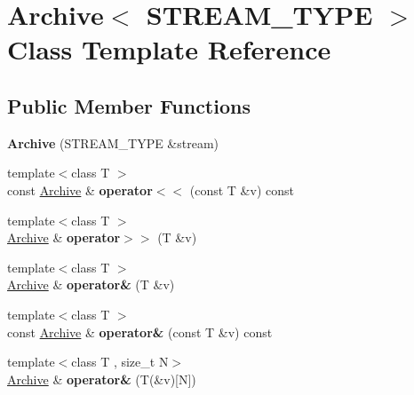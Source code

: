 \hypertarget{classArchive}{\section{Archive$<$ S\-T\-R\-E\-A\-M\-\_\-\-T\-Y\-P\-E $>$ Class Template Reference}
\label{classArchive}
}
\subsection*{Public Member Functions}
\begin{DoxyCompactItemize}
\item 
\hypertarget{classArchive_aa665ba05fffdc5e1abe19ded6dae02fa}{{\bfseries Archive} (S\-T\-R\-E\-A\-M\-\_\-\-T\-Y\-P\-E \&stream)}\label{classArchive_aa665ba05fffdc5e1abe19ded6dae02fa}

\item 
\hypertarget{classArchive_a0abd6dd392807577b2a3dbe6911bc084}{{\footnotesize template$<$class T $>$ }\\const \hyperlink{classArchive}{Archive} \& {\bfseries operator$<$$<$} (const T \&v) const }\label{classArchive_a0abd6dd392807577b2a3dbe6911bc084}

\item 
\hypertarget{classArchive_a6f85cc9fdc62ada7fc1e0c94ddc9913c}{{\footnotesize template$<$class T $>$ }\\\hyperlink{classArchive}{Archive} \& {\bfseries operator$>$$>$} (T \&v)}\label{classArchive_a6f85cc9fdc62ada7fc1e0c94ddc9913c}

\item 
\hypertarget{classArchive_a3f96721a2993a96df1d484a407db93c3}{{\footnotesize template$<$class T $>$ }\\\hyperlink{classArchive}{Archive} \& {\bfseries operator\&} (T \&v)}\label{classArchive_a3f96721a2993a96df1d484a407db93c3}

\item 
\hypertarget{classArchive_aca7d35950d038e9ca8feb9a2a7d3ad12}{{\footnotesize template$<$class T $>$ }\\const \hyperlink{classArchive}{Archive} \& {\bfseries operator\&} (const T \&v) const }\label{classArchive_aca7d35950d038e9ca8feb9a2a7d3ad12}

\item 
\hypertarget{classArchive_abaa6ed2174f438173b133fdba7190963}{{\footnotesize template$<$class T , size\-\_\-t N$>$ }\\\hyperlink{classArchive}{Archive} \& {\bfseries operator\&} (T(\&v)\mbox{[}N\mbox{]})}\label{classArchive_abaa6ed2174f438173b133fdba7190963}


\end{DoxyCompactItemize}
